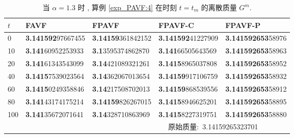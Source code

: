 \begin{table}[H]\footnotesize
	\centering
	\caption{当 $\alpha=1.3$ 时 , 算例 \ref{exp_PAVF:4}  在时刻 $t=t_{m}$ 的离散质量 $G^{m}$.}
	
	\begin{tabular}{p{0.7cm}p{3cm}p{3cm}p{3cm}p{3cm}}
	  \toprule
$t$   &FAVF   &FPAVF   &FPAVF-C   &FPAVF-P\\
	\midrule
	0     & \textbf{3.141592}97667455 & \textbf{3.14159}361842152 & \textbf{3.141592}41227909 & \textbf{3.141592653}58976 \\
	10    & \textbf{3.141}60952253933 & \textbf{3.1}3595374862870 & \textbf{3.141}66505643569 & \textbf{3.141592653}58963 \\
	20    & \textbf{3.141}61343543099 & \textbf{3.14}421089321261 & \textbf{3.1415}8965037808 & \textbf{3.141592653}58952 \\
	40    & \textbf{3.1415}7539023564 & \textbf{3.14}362067013654 & \textbf{3.14159}917106759 & \textbf{3.141592653}58932 \\
	60    & \textbf{3.1415}0249358846 & \textbf{3.14}217508702013 & \textbf{3.14159}868539556 & \textbf{3.141592653}58912 \\
	80    & \textbf{3.141}43174175214 & \textbf{3.14159}826267015 & \textbf{3.1415}8946625201 & \textbf{3.141592653}58895 \\
	100   & \textbf{3.141}35672071641 & \textbf{3.14}328710863969 & \textbf{3.1415}8227319751 & \textbf{3.141592653}58880 \\
	\midrule
	  \multicolumn{5}{r}{原始质量:~3.14159265323701~~~~~~~~} \\
	  \bottomrule
	  \end{tabular}\label{tab_PAVF:4-2}%
  \end{table}%

